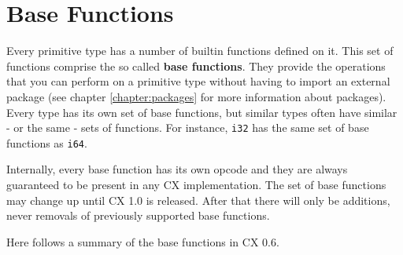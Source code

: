 \documentclass[11pt,fleqn,openany]{book} %
\begin{document}


\section{Base Functions}

Every primitive type has a number of builtin functions defined on it. This set of functions comprise the so called \textbf{base functions}. They provide the operations that you can perform on a primitive type without having to import an external package (see chapter \ref{chapter:packages} for more information about packages).  Every type has its own set of base functions, but similar types often have similar - or the same - sets of functions.  For instance, \texttt{i32} has the same set of base functions as \texttt{i64}.

Internally, every base function has its own opcode and they are always guaranteed to be present in any CX implementation. The set of base functions may change up until CX 1.0 is released. After that there will only be additions, never removals of previously supported base functions.

Here follows a summary of the base functions in CX 0.6.
\end{document}
